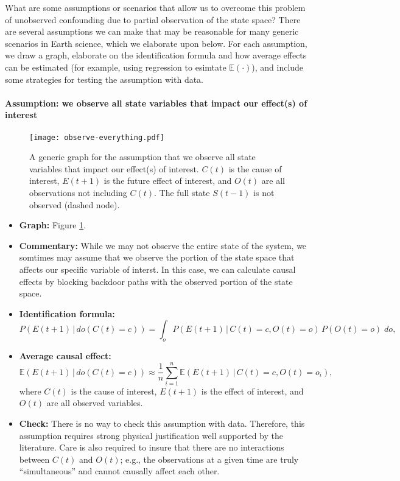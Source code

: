 \documentclass[12pt]{article}
\begin{document}
What are some assumptions or scenarios that allow us to overcome this
problem of unobserved confounding due to partial observation of the
state space? There are several assumptions we can make that may be
reasonable for many generic scenarios in Earth science, which we
elaborate upon below. For each assumption, we draw a graph, elaborate
on the identification formula and how average effects can be estimated
(for example, using regression to esimtate $\mathbb{E}(\cdot )$), and
include some strategies for testing the assumption with data.

\paragraph{Assumption: we observe all state variables that impact our effect(s) of interest}

\begin{figure}[H]
  \texttt{[image: observe-everything.pdf]}
  \caption{A generic graph for the assumption that we observe all
    state variables that impact our effect(s) of interest. $C(t)$ is
    the cause of interest, $E(t+1)$ is the future effect of interest,
    and $O(t)$ are all observations not including $C(t)$. The full
    state $S(t-1)$ is not observed (dashed node).}
  \label{fig:observe-everything}
\end{figure}

\begin{itemize}
\item \textbf{Graph:} Figure \ref{fig:observe-everything}.
\item \textbf{Commentary:} While we may not observe the entire state
  of the system, we somtimes may assume that we observe the portion of
  the state space that affects our specific variable of interst. In
  this case, we can calculate causal effects by blocking backdoor
  paths with the observed portion of the state space.
\item \textbf{Identification formula:}
  \begin{equation*}
    P(E(t+1) \, | \, do(C(t) = c)) = \int_{o} P(E(t+1) \, | \, C(t) = c,
    O(t) = o) \, P(O(t)=o) \; d o,
  \end{equation*}
\item \textbf{Average causal effect:}
  \begin{equation*}
    \mathbb{E}(E(t+1) \, | \, do(C(t) = c)) \approx \frac{1}{n}
    \sum_{i=1}^n \mathbb{E}(E(t+1) \, | \, C(t)=c, O(t)=o_i),
  \end{equation*}
  where $C(t)$ is the cause of interest, $E(t+1)$ is the effect of
  interest, and $O(t)$ are all observed variables.
\item \textbf{Check:} There is no way to check this assumption with
  data. Therefore, this assumption requires strong physical
  justification well supported by the literature. Care is also
  required to insure that there are no interactions between $C(t)$ and
  $O(t)$; e.g., the observations at a given time are truly
  ``simultaneous'' and cannot causally affect each other.
\end{itemize}
\end{document}

